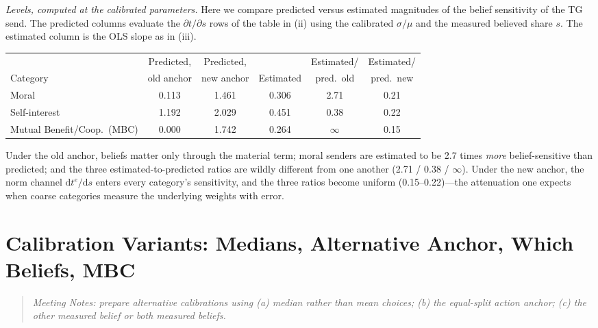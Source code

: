 \documentclass[11pt]{article}
\newcommand{\code}[1]{\path{#1}}
\begin{document}
\emph{Levels, computed at the calibrated parameters.} Here we compare predicted
versus estimated magnitudes of the belief sensitivity of the TG send. The predicted
columns evaluate the $\partial t/\partial s$ rows of the table in (ii) using the calibrated $\sigma/\mu$ and the measured believed share $s$. The estimated column is the OLS slope as in (iii).

\begin{center}
\small
\begin{tabular}{l ccccc}
\toprule
& Predicted, & Predicted, & & Estimated/ & Estimated/ \\
Category & old anchor & new anchor & Estimated & pred.\ old & pred.\ new \\
\midrule
Moral & 0.113 & 1.461 & 0.306 & 2.71 & 0.21 \\
Self-interest & 1.192 & 2.029 & 0.451 & 0.38 & 0.22 \\
Mutual Benefit/Coop.\ (MBC) & 0.000 & 1.742 & 0.264 & $\infty$ & 0.15 \\
\bottomrule
\end{tabular}
\end{center}

Under the old anchor, beliefs matter only through the material term; moral senders are estimated to be 2.7 times
\emph{more} belief-sensitive than predicted; and the three estimated-to-predicted
ratios are wildly different from one another (2.71 / 0.38 / $\infty$). Under the new
anchor, the norm channel $\mathrm{d}t^{e}/\mathrm{d}s$ enters every category's
sensitivity, and the three ratios become uniform (0.15--0.22)---the attenuation one
expects when coarse categories measure the underlying weights with error.

\section{Calibration Variants: Medians, Alternative Anchor, Which Beliefs, MBC}

\begin{quote}\itshape
Meeting Notes: prepare alternative calibrations using (a) median rather than mean
choices; (b) the equal-split action anchor; (c) the other measured belief or both measured beliefs.
\end{quote}

\end{document}

